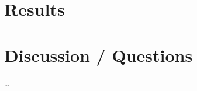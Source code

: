 \documentclass{i20lecture}
\begin{document}
\section{Results}



\section{Discussion / Questions}
\begin{frame}{\insertsection}
  \begin{center}
    \LARGE \dots
  \end{center}
\end{frame}
\end{document}
